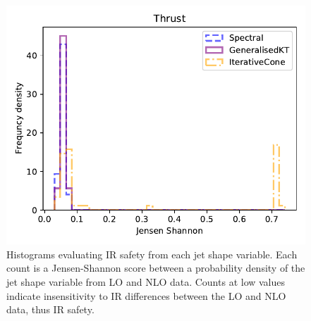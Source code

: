 \begin{figure}[htp]
\begin{minipage}[c]{0.5\textwidth}
        \includegraphics[width=1.\textwidth]{graphics/js_scores/thrust}
    \end{minipage}\hfill
    \begin{minipage}[c]{0.5\textwidth}
    \caption{
        Histograms evaluating IR safety from each jet shape variable.
        Each count is a  Jensen-Shannon score between a probability density of the
        jet shape variable from LO and NLO data.
        Counts at low values indicate insensitivity to IR differences between the LO and NLO data,
        thus IR safety.
     }\label{fig:unnormedJS}
    \end{minipage}
\end{figure}    


